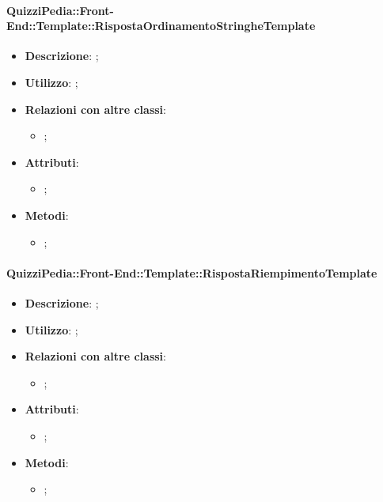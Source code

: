 		\paragraph{QuizziPedia::Front-End::Template::RispostaOrdinamentoStringheTemplate}
			\begin{itemize}
				\item \textbf{Descrizione}: ;
				\item \textbf{Utilizzo}: ;
				\item \textbf{Relazioni con altre classi}: 
				\begin{itemize}
					\item ;
				\end{itemize}
				\item \textbf{Attributi}: 
				\begin{itemize}
					\item ;
				\end{itemize}
				\item \textbf{Metodi}: 
				\begin{itemize}
					\item ;
				\end{itemize}
			\end{itemize}
		
		\paragraph{QuizziPedia::Front-End::Template::RispostaRiempimentoTemplate}
			\begin{itemize}
				\item \textbf{Descrizione}: ;
				\item \textbf{Utilizzo}: ;
				\item \textbf{Relazioni con altre classi}: 
				\begin{itemize}
					\item ;
				\end{itemize}
				\item \textbf{Attributi}: 
				\begin{itemize}
					\item ;
				\end{itemize}
				\item \textbf{Metodi}: 
				\begin{itemize}
					\item ;
				\end{itemize}
			\end{itemize}
		

